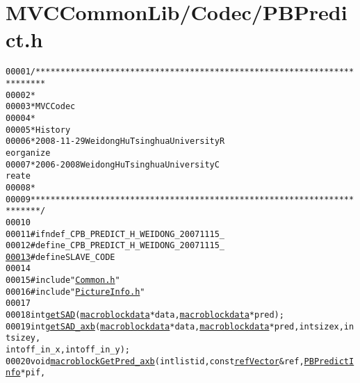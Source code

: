 \hypertarget{_m_v_c_common_lib_2_codec_2_p_b_predict_8h_source}{
\section{MVCCommonLib/Codec/PBPredict.h}
}


\begin{footnotesize}\begin{alltt}
00001 \textcolor{comment}{/************************************************************************}
00002 \textcolor{comment}{ *}
00003 \textcolor{comment}{ * MVC Codec}
00004 \textcolor{comment}{ * }
00005 \textcolor{comment}{ * History}
00006 \textcolor{comment}{ * 2008-11-29           Weidong Hu              Tsinghua University             R
      eorganize}
00007 \textcolor{comment}{ * 2006-2008            Weidong Hu              Tsinghua University             C
      reate}
00008 \textcolor{comment}{ * }
00009 \textcolor{comment}{ ************************************************************************/}
00010 
00011 \textcolor{preprocessor}{#ifndef \_CPB\_PREDICT\_H\_WEIDONG\_20071115\_}
00012 \textcolor{preprocessor}{}\textcolor{preprocessor}{#define \_CPB\_PREDICT\_H\_WEIDONG\_20071115\_}
\hypertarget{_m_v_c_common_lib_2_codec_2_p_b_predict_8h_source_l00013}{}\hyperlink{_m_v_c_common_lib_2_codec_2_p_b_predict_8h_a995f6a4907273b8d56b6543ab1a57d17}{00013} \textcolor{preprocessor}{}\textcolor{preprocessor}{#define SLAVE\_CODE}
00014 \textcolor{preprocessor}{}
00015 \textcolor{preprocessor}{#include "\hyperlink{_common_8h}{Common.h}"}
00016 \textcolor{preprocessor}{#include "\hyperlink{_picture_info_8h}{PictureInfo.h}"}
00017 
00018 \textcolor{keywordtype}{int} \hyperlink{_m_v_c_common_lib_2_codec_2_p_b_predict_8cpp_a1ebf436cd932cc02e36d3e20c24f7a73}{getSAD}(\hyperlink{structmacroblockdata}{macroblockdata} *data, \hyperlink{structmacroblockdata}{macroblockdata} *pred);
00019 \textcolor{keywordtype}{int} \hyperlink{_m_v_c_common_lib_2_codec_2_p_b_predict_8cpp_af7d15d5af074dd965dff83d25049c9b5}{getSAD_axb}(\hyperlink{structmacroblockdata}{macroblockdata} *data, \hyperlink{structmacroblockdata}{macroblockdata} *pred, \textcolor{keywordtype}{int} sizex, \textcolor{keywordtype}{int} sizey, 
      \textcolor{keywordtype}{int} off\_in\_x, \textcolor{keywordtype}{int} off\_in\_y);
00020 \textcolor{keywordtype}{void} \hyperlink{_m_v_c_common_lib_2_codec_2_p_b_predict_8cpp_aae19b8dbe8243ab186626f8b8570ef50}{macroblockGetPred_axb}(\textcolor{keywordtype}{int} listid, \textcolor{keyword}{const} \hyperlink{structref_vector}{refVector} &ref, \hyperlink{struct_p_b_predict_info}{PBPredictInfo} *pif, 

\end{alltt}
\end{footnotesize}
